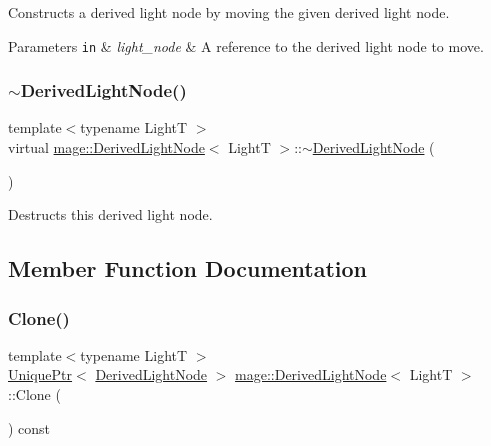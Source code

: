 Constructs a derived light node by moving the given derived light node.


\begin{DoxyParams}[1]{Parameters}
\mbox{\tt in}  & {\em light\+\_\+node} & A reference to the derived light node to move. \\
\hline
\end{DoxyParams}
\hypertarget{classmage_1_1_derived_light_node_ad4b2371e323d30eda05744237d4dc4eb}{}\label{classmage_1_1_derived_light_node_ad4b2371e323d30eda05744237d4dc4eb} 
\subsubsection{\texorpdfstring{$\sim$\+Derived\+Light\+Node()}{~DerivedLightNode()}}
{\footnotesize\ttfamily template$<$typename LightT $>$ \\
virtual \hyperlink{classmage_1_1_derived_light_node}{mage\+::\+Derived\+Light\+Node}$<$ LightT $>$\+::$\sim$\hyperlink{classmage_1_1_derived_light_node}{Derived\+Light\+Node} (\begin{DoxyParamCaption}{ }\end{DoxyParamCaption})\hspace{0.3cm}{\ttfamily [virtual]}}

Destructs this derived light node. 

\subsection{Member Function Documentation}
\hypertarget{classmage_1_1_derived_light_node_a38fcbc8d5204f92d0dfd87c1c6d10281}{}\label{classmage_1_1_derived_light_node_a38fcbc8d5204f92d0dfd87c1c6d10281} 
\subsubsection{\texorpdfstring{Clone()}{Clone()}}
{\footnotesize\ttfamily template$<$typename LightT $>$ \\
\hyperlink{namespacemage_a8c307fbcc33bce9b7f2aa4c26c3b95cf}{Unique\+Ptr}$<$ \hyperlink{classmage_1_1_derived_light_node}{Derived\+Light\+Node} $>$ \hyperlink{classmage_1_1_derived_light_node}{mage\+::\+Derived\+Light\+Node}$<$ LightT $>$\+::Clone (\begin{DoxyParamCaption}{ }\end{DoxyParamCaption}) const}


